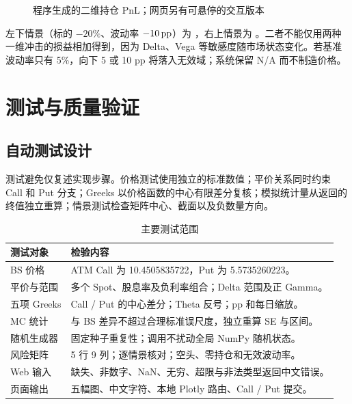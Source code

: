 \documentclass[UTF8,a4paper,12pt]{ctexart}
\begin{document}
\begin{figure}[H]\centering
{}
\caption{程序生成的二维持仓 PnL；网页另有可悬停的交互版本}
\end{figure}

左下情景（标的 $-20\%$、波动率 $-10\,\mathrm{pp}$）为 \GridLow，右上情景为 \GridHigh。二者不能仅用两种一维冲击的损益相加得到，因为 Delta、Vega 等敏感度随市场状态变化。若基准波动率只有 5\%，向下 5 或 10 pp 将落入无效域；系统保留 N/A 而不制造价格。
\newpage

\section{测试与质量验证}
\subsection{自动测试设计}
测试避免仅复述实现步骤。价格测试使用独立的标准数值；平价关系同时约束 Call 和 Put 分支；Greeks 以价格函数的中心有限差分复核；模拟统计量从返回的终值独立重算；情景测试检查矩阵中心、截面以及负数量方向。

\begin{table}[H]\centering\small
\begin{tabularx}{\linewidth}{lX}\toprule 测试对象 & 检验内容\\\midrule
BS 价格 & ATM Call 为 10.4505835722，Put 为 5.5735260223。\\
平价与范围 & 多个 Spot、股息率及负利率组合；Delta 范围及正 Gamma。\\
五项 Greeks & Call / Put 的中心差分；Theta 反号；pp 和每日缩放。\\
MC 统计 & 与 BS 差异不超过合理标准误尺度，独立重算 SE 与区间。\\
随机生成器 & 固定种子重复性；调用不扰动全局 NumPy 随机状态。\\
风险矩阵 & 5 行 9 列；逐情景核对；空头、零持仓和无效波动率。\\
Web 输入 & 缺失、非数字、NaN、无穷、超限与非法类型返回中文错误。\\
页面输出 & 五幅图、中文字符、本地 Plotly 路由、Call / Put 提交。\\\bottomrule
\end{tabularx}\caption{主要测试范围}
\end{table}
\end{document}

